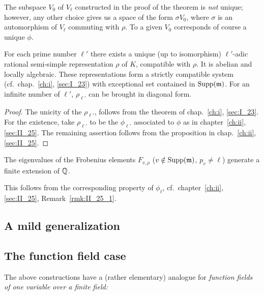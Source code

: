 \begin{obs}
	The subspace $V_0$ of $V_\ell$ constructed in the proof of the theorem
	is \emph{not} unique; however, any other choice gives us a space of the
	form $\sigma V_0$, where $\sigma$ is an automorphism of $V_\ell$
	commuting with $\rho$. To a given $V_0$ corresponds of course a unique
	$\phi$.
\end{obs}

\begin{cor}
	For each prime number $\ell'$ there exists a unique (up to isomorphism)
	$\ell'$-adic rational semi-simple representation $\rho$ of $K$,
	compatible with $\rho$. It is abelian and locally algebraic.  These
	representations form a strictly compatible system (cf.\
	chap.~\ref{ch:i}, \ref{sec:I_23}) with exceptional set contained in
	$\operatorname{Supp}(\mathfrak{m})$. For an infinite number of $\ell'$,
	$\rho_{\ell'}$ can be brought in diagonal form.
\end{cor}
\begin{proof}
	The unicity of the $\rho_{\ell'}$, follows from the theorem of
	chap.~\ref{ch:i}, \ref{sec:I_23}. For the existence, take
	$\rho_{\ell'}$ to be the $\phi_{\ell'}$ associated to $\phi$ as
	in chapter~\ref{ch:ii}, \ref{sec:II_25}. The remaining assertion
	follows from the proposition in chap.~\ref{ch:ii}, \ref{sec:II_25}.
\end{proof}

\begin{cor}
	The eigenvalues of the Frobenius elements $F_{v, \rho}$ ($v \notin
	\operatorname{Supp}(\mathfrak{m})$, $p_v \ne \ell$) generate a finite extension of
	$\mathbb{Q}$.
\end{cor}
This follows from the corresponding property of $\phi_\ell$, cf.\
chapter~\ref{ch:ii}, \ref{sec:II_25}, Remark~\ref{rmk:II_25_1}.

\subsection{A mild generalization}
\label{sec:III_24}

\subsection{The function field case}
\label{sec:III_25}
The above constructions have a (rather elementary) analogue
for \emph{function fields of one variable over a finite field:}

